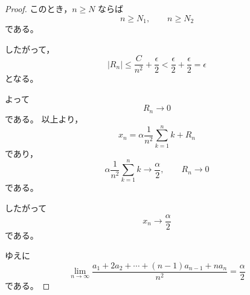 \begin{proof}
    このとき，$n\geq N$ ならば
    \[
        n\geq N_1,
        \qquad
        n\geq N_2
    \]
    である。

    したがって，
    \[
        |R_n|
        \leq
        \frac{C}{n^2}
        +
        \frac{\epsilon}{2}
        <
        \frac{\epsilon}{2}
        +
        \frac{\epsilon}{2}
        =
        \epsilon
    \]
    となる。

    よって
    \[
        R_n\to 0
    \]
    である。
    以上より，
    \[
        x_n
        =
        \alpha\frac{1}{n^2}\sum_{k=1}^{n}k
        +
        R_n
    \]
    であり，
    \[
        \alpha\frac{1}{n^2}\sum_{k=1}^{n}k
        \to
        \frac{\alpha}{2},
        \qquad
        R_n\to 0
    \]
    である。

    したがって
    \[
        x_n\to \frac{\alpha}{2}
    \]
    である。

    ゆえに
    \[
        \lim_{n\to\infty}
        \frac{a_1+2a_2+\cdots+(n-1)a_{n-1}+na_n}{n^2}
        =
        \frac{\alpha}{2}
    \]
    である。
\end{proof}